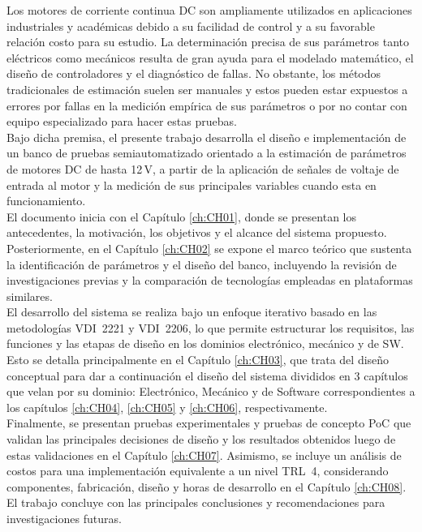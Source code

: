 

\noindent
Los motores de corriente continua DC son ampliamente utilizados en aplicaciones industriales y académicas debido a su facilidad de control y a su favorable relación costo para su estudio. La determinación precisa de sus parámetros tanto eléctricos como mecánicos resulta de gran ayuda para el modelado matemático, el diseño de controladores y el diagnóstico de fallas. No obstante, los métodos tradicionales de estimación suelen ser manuales y estos pueden estar expuestos a errores por fallas en la medición empírica de sus parámetros o por no contar con equipo especializado para hacer estas pruebas.
\\
\noindent
Bajo dicha premisa, el presente trabajo desarrolla el diseño e implementación de un banco de pruebas semiautomatizado orientado a la estimación de parámetros de motores DC de hasta 12\,V, a partir de la aplicación de señales de voltaje de entrada al motor y la medición de sus principales variables cuando esta en funcionamiento.
\\
\noindent
El documento inicia con el Capítulo \ref{ch:CH01}, donde se presentan los antecedentes, la motivación, los objetivos y el alcance del sistema propuesto. Posteriormente, en el Capítulo \ref{ch:CH02} se expone el marco teórico que sustenta la identificación de parámetros y el diseño del banco, incluyendo la revisión de investigaciones previas y la comparación de tecnologías empleadas en plataformas similares.
\\
\noindent
El desarrollo del sistema se realiza bajo un enfoque iterativo basado en las metodologías VDI~2221 y VDI~2206, lo que permite estructurar los requisitos, las funciones y las etapas de diseño en los dominios electrónico, mecánico y de SW. Esto se detalla principalmente en el Capítulo \ref{ch:CH03}, que trata del diseño conceptual para dar a continuación el diseño del sistema divididos en 3 capítulos que velan por su dominio: Electrónico, Mecánico y de Software correspondientes a los capítulos \ref{ch:CH04}, \ref{ch:CH05} y \ref{ch:CH06}, respectivamente.
\\
\noindent
Finalmente, se presentan pruebas experimentales y pruebas de concepto PoC que validan las principales decisiones de diseño y los resultados obtenidos luego de estas validaciones en el Capítulo \ref{ch:CH07}. Asimismo, se incluye un análisis de costos para una implementación equivalente a un nivel TRL~4, considerando componentes, fabricación, diseño y horas de desarrollo en el Capítulo \ref{ch:CH08}. El trabajo concluye con las principales conclusiones y recomendaciones para investigaciones futuras.
